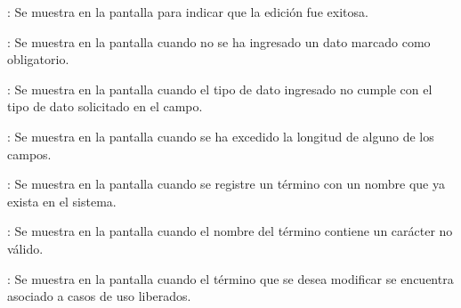 \begin{Citemize}
	\item {}: Se muestra en la pantalla  para indicar que la edición fue exitosa.
	\item {}: Se muestra en la pantalla  cuando no se ha ingresado un dato marcado como obligatorio.
	\item {}: Se muestra en la pantalla  cuando el tipo de dato ingresado no cumple con el tipo de dato solicitado en el campo.
	\item {}: Se muestra en la pantalla  cuando se ha excedido la longitud de alguno de los campos.
	\item {}: Se muestra en la pantalla  cuando se registre un término con un nombre que ya exista en el sistema.
	\item {}: Se muestra en la pantalla  cuando el nombre del término contiene un carácter no válido.
	\item {}: Se muestra en la pantalla  cuando el término que se desea modificar se encuentra asociado a casos de uso liberados.
\end{Citemize}
